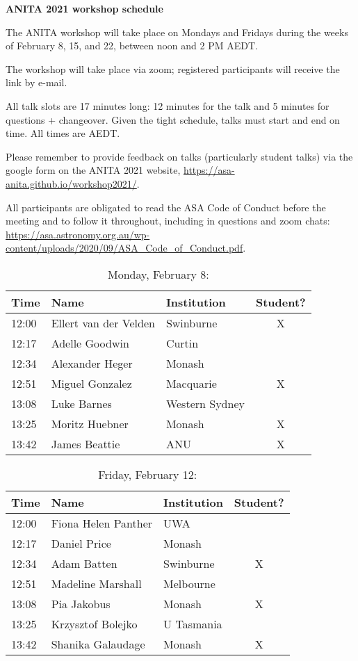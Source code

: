 \documentclass[amsmath,onecolumn]{revtex4-1}
\begin{document}
\begin{center}
{\bf ANITA 2021 workshop schedule}\\
\end{center}
\vspace{0.2in}

The ANITA workshop will take place on Mondays and Fridays during the weeks of February 8, 15, and 22, between noon and 2 PM AEDT.

The workshop will take place via zoom; registered participants will receive the link by e-mail.  

All talk slots are 17 minutes long: 12 minutes for the talk and 5 minutes for questions + changeover.  Given the tight schedule, talks must start and end on time.  All times are AEDT.

Please remember to provide feedback on talks (particularly student talks) via the google form on the ANITA 2021 website, \url{https://asa-anita.github.io/workshop2021/}.

All participants are obligated to read the ASA Code of Conduct before the meeting and to follow it throughout, including in questions and zoom chats:
\url{https://asa.astronomy.org.au/wp-content/uploads/2020/09/ASA_Code_of_Conduct.pdf}.

\FloatBarrier

\begin{table}[!htbp]
	\centering
	\caption{Monday, February 8:}
\begin{tabular}{| l | l | l | c |}
	\hline
	Time & Name  & Institution & Student? \\ 		
	\hline
	12:00 & Ellert van der Velden & Swinburne & X \\
	12:17 & Adelle Goodwin & Curtin & \\
	12:34 & Alexander	Heger & Monash & \\
	12:51 & 	Miguel	Gonzalez & Macquarie & X\\
	13:08 & Luke	Barnes & Western Sydney & \\
	13:25 & Moritz	Huebner & Monash & X \\
	13:42 & James	Beattie & ANU  & X \\
	\hline
\end{tabular}
\end{table}

\begin{table}[!htbp]
	\centering
	\caption{Friday, February 12:}
\begin{tabular}{| l | l | l | c |}
	\hline
	Time & Name  & Institution & Student? \\ 		
	\hline
	12:00 &  Fiona Helen	Panther  & UWA &  \\
	12:17 & Daniel Price & Monash & \\
	12:34 & Adam	Batten & Swinburne & X \\
	12:51 & Madeline	Marshall &  Melbourne & \\
	13:08 & Pia	Jakobus & Monash & X \\
	13:25 & Krzysztof 	Bolejko & U Tasmania  &	\\
	13:42 & Shanika	Galaudage & Monash & X\\
	\hline
\end{tabular}
\end{table}
\end{document}
